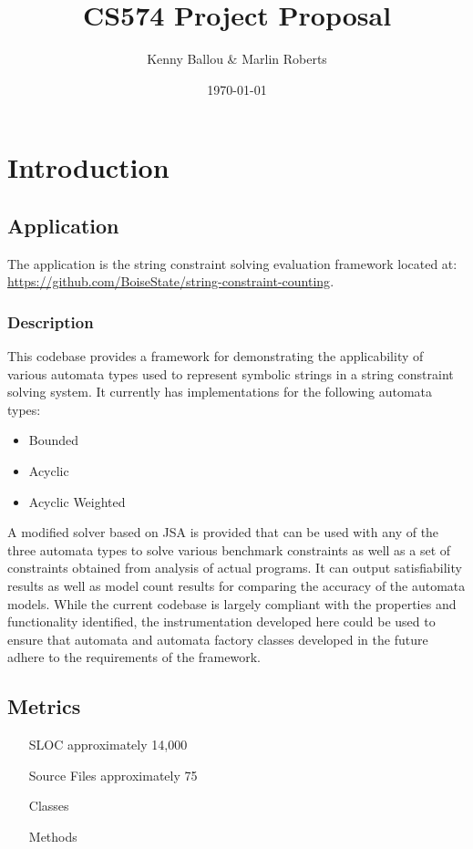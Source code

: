 \documentclass[letterpaper,11pt]{article}
\title{CS574 Project Proposal}
\date{\today}
\author{Kenny Ballou \& Marlin Roberts}
\begin{document}
\maketitle{}
\tableofcontents{}

\section{Introduction}

\subsection{Application}

The application is the string constraint solving evaluation framework located
at: \url{https://github.com/BoiseState/string-constraint-counting}.

\subsubsection{Description}

This codebase provides a framework for demonstrating the applicability of
various automata types used to represent symbolic strings in a string
constraint solving system.  It currently has implementations for the following
automata types:

\begin{itemize}
\item{Bounded}
\item{Acyclic}
\item{Acyclic Weighted}
\end{itemize}

A modified solver based on JSA is provided that can be used with any of the
three automata types to solve various benchmark constraints as well as a set of
constraints obtained from analysis of actual programs. It can output
satisfiability results as well as model count results for comparing the
accuracy of the automata models.  While the current codebase is largely
compliant with the properties and functionality identified, the instrumentation
developed here could be used to ensure that automata and automata factory
classes developed in the future adhere to the requirements of the framework.

\subsection{Metrics}

\begin{itemize}
\item[SLOC]{approximately 14,000}
\item[Source Files]{approximately 75}
\item[Classes]{}
\item[Methods]{}
\end{itemize}
\end{document}
